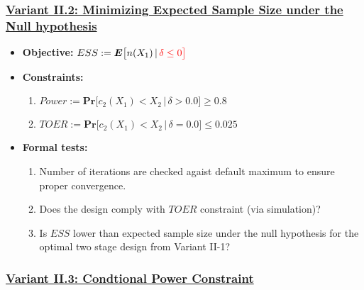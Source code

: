 \documentclass[]{book}
\providecommand{\tightlist}{%
  \setlength{\itemsep}{0pt}\setlength{\parskip}{0pt}}
\begin{document}
\hypertarget{variant-ii.2-minimizing-expected-sample-size-under-the-null-hypothesis}{%
\subsubsection{\texorpdfstring{\protect\hyperlink{variantII_2}{Variant II.2: Minimizing Expected Sample Size under the Null hypothesis}}{Variant II.2: Minimizing Expected Sample Size under the Null hypothesis}}\label{variant-ii.2-minimizing-expected-sample-size-under-the-null-hypothesis}}

\begin{itemize}
\tightlist
\item
  \textbf{Objective:} \(ESS := \boldsymbol{E}\big[n(X_1)\,|\,\color{red}{\delta\leq 0}\big]\)
\item
  \textbf{Constraints:}

  \begin{enumerate}
  \def\labelenumi{\arabic{enumi}.}
  \tightlist
  \item
    \(Power := \boldsymbol{Pr}\big[c_2(X_1) < X_2\,|\,\delta> 0.0\big] \geq 0.8\)
  \item
    \(TOER := \boldsymbol{Pr}\big[c_2(X_1) < X_2\,|\,\delta=0.0\big] \leq 0.025\)
  \end{enumerate}
\item
  \textbf{Formal tests:}

  \begin{enumerate}
  \def\labelenumi{\arabic{enumi}.}
  \tightlist
  \item
    Number of iterations are checked agaist default maximum to ensure proper
    convergence.
  \item
    Does the design comply with \(TOER\) constraint (via simulation)?
  \item
    Is \(ESS\) lower than expected sample size under the null hypothesis
    for the optimal two stage design from Variant II-1?
  \end{enumerate}
\end{itemize}

\hypertarget{variant-ii.3-condtional-power-constraint}{%
\subsubsection{\texorpdfstring{\protect\hyperlink{variantII_3}{Variant II.3: Condtional Power Constraint}}{Variant II.3: Condtional Power Constraint}}\label{variant-ii.3-condtional-power-constraint}}
\end{document}
